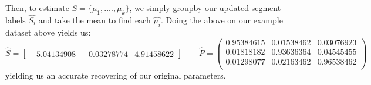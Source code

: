 \documentclass[a4paper]{amsproc}
\theoremstyle{plain}
\theoremstyle{definition}
\theoremstyle{remark}
\numberwithin{equation}{section}
\begin{document}
    Then, to estimate $S = \{\mu_1, ...., \mu_k\}$, we simply groupby our updated segment labels $\hat{S_i}$ and take the mean to find each $\hat{\mu_i}$. Doing the above on our example dataset above yields us:
    \[
    \hat{S} = \begin{bmatrix} -5.04134908 & -0.03278774 & 4.91458622 \end{bmatrix}
    \qquad
    \hat{P} = \begin{pmatrix} 
    0.95384615 & 0.01538462 & 0.03076923 \\
    0.01818182 & 0.93636364 & 0.04545455 \\
    0.01298077 & 0.02163462 & 0.96538462 \\
    \end{pmatrix}
    \]
	yielding us an accurate recovering of our original parameters.\\
    
\end{document}
